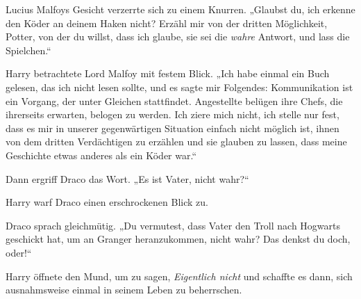 Lucius Malfoys Gesicht verzerrte sich zu einem Knurren.
„Glaubst du, ich erkenne den Köder an deinem Haken nicht? Erzähl mir von der dritten Möglichkeit, Potter, von der du willst, dass ich glaube, sie sei die \emph{wahre} Antwort, und lass die Spielchen.“

Harry betrachtete Lord Malfoy mit festem Blick.
„Ich habe einmal ein Buch gelesen, das ich nicht lesen sollte, und es sagte mir Folgendes: Kommunikation ist ein Vorgang, der unter Gleichen stattfindet. Angestellte belügen ihre Chefs, die ihrerseits erwarten, belogen zu werden. Ich ziere mich nicht, ich stelle nur fest, dass es mir in unserer gegenwärtigen Situation einfach nicht möglich ist, ihnen von dem dritten Verdächtigen zu erzählen und sie glauben zu lassen, dass meine Geschichte etwas anderes als ein Köder war.“

Dann ergriff Draco das Wort.
„Es ist Vater, nicht wahr?“

Harry warf Draco einen erschrockenen Blick zu.

Draco sprach gleichmütig.
„Du vermutest, dass Vater den Troll nach Hogwarts geschickt hat, um an Granger heranzukommen, nicht wahr? Das denkst du doch, oder!“

Harry öffnete den Mund, um zu sagen, \emph{Eigentlich nicht} und schaffte es dann, sich ausnahmsweise einmal in seinem Leben zu beherrschen.

